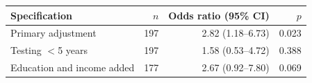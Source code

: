 \begin{tabular}{@{}lrrr@{}}
\toprule
Specification & $n$ & Odds ratio (95\% CI) & $p$\\
\midrule
Primary adjustment & 197 & 2.82 (1.18--6.73) & 0.023\\
Testing $<$5 years & 197 & 1.58 (0.53--4.72) & 0.388\\
Education and income added & 177 & 2.67 (0.92--7.80) & 0.069\\
\bottomrule
\end{tabular}
